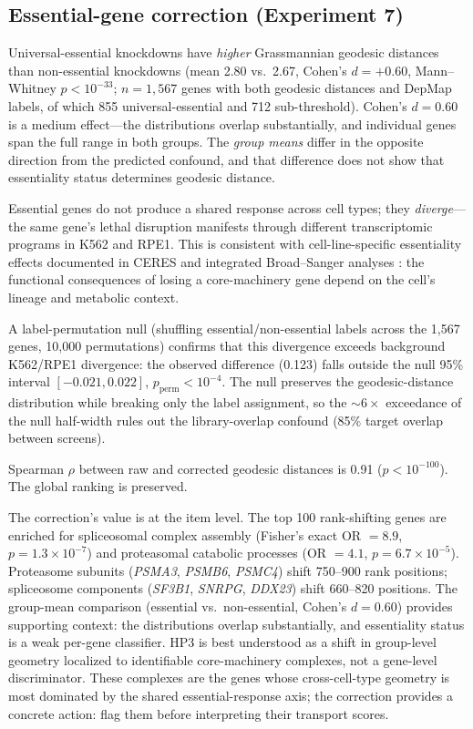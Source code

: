 \documentclass[11pt]{article}
\begin{document}
\subsection{Essential-gene correction (Experiment 7)}

Universal-essential knockdowns have \emph{higher} Grassmannian geodesic
distances than non-essential knockdowns (mean 2.80 vs.\ 2.67, Cohen's $d =
+0.60$, Mann--Whitney $p < 10^{-33}$; $n = 1{,}567$ genes with both
geodesic distances and DepMap labels, of which 855 universal-essential and
712 sub-threshold). Cohen's $d = 0.60$ is a medium effect---the
distributions overlap substantially, and individual genes span the full
range in both groups. The \emph{group means} differ in the opposite
direction from the predicted confound, and that difference does not show
that essentiality status determines geodesic distance.

Essential genes do not produce a shared response across cell types; they
\emph{diverge}---the same gene's lethal disruption manifests through
different transcriptomic programs in K562 and RPE1. This is consistent with cell-line-specific
essentiality effects documented in CERES \citep{meyers2017ceres} and
integrated Broad--Sanger analyses \citep{pacini2021integrated}: the
functional consequences of losing a core-machinery gene depend on
the cell's lineage and metabolic context.

A label-permutation null (shuffling essential/non-essential labels across
the 1{,}567 genes, 10{,}000 permutations) confirms that this divergence
exceeds background K562/RPE1 divergence: the observed difference (0.123)
falls outside the null 95\% interval $[-0.021, 0.022]$,
$p_{\text{perm}} < 10^{-4}$. The null preserves the geodesic-distance
distribution while breaking only the label assignment, so the ${\sim}6\times$
exceedance of the null half-width rules out the library-overlap confound
(85\% target overlap between screens).

Spearman $\rho$ between raw and corrected geodesic distances is 0.91
($p < 10^{-100}$). The global ranking is preserved.

The correction's value is at the item level. The top 100 rank-shifting
genes are enriched for spliceosomal complex assembly (Fisher's exact
OR $= 8.9$, $p = 1.3 \times 10^{-7}$) and proteasomal catabolic
processes (OR $= 4.1$, $p = 6.7 \times 10^{-5}$). Proteasome subunits
(\emph{PSMA3}, \emph{PSMB6}, \emph{PSMC4}) shift 750--900 rank positions;
spliceosome components (\emph{SF3B1}, \emph{SNRPG}, \emph{DDX23}) shift
660--820 positions. The group-mean comparison (essential vs.\ non-essential,
Cohen's $d = 0.60$) provides supporting context: the distributions overlap
substantially, and essentiality status is a weak per-gene classifier.
HP3 is best understood as a shift in group-level geometry localized to
identifiable core-machinery complexes, not a gene-level discriminator.
These complexes are the genes whose cross-cell-type geometry is most
dominated by the shared essential-response axis; the correction provides a
concrete action: flag them before interpreting their transport scores.
\end{document}
